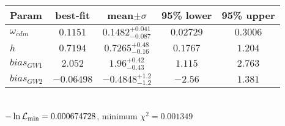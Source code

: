 \begin{tabular}{|l|c|c|c|c|} 
 \hline 
Param & best-fit & mean$\pm\sigma$ & 95\% lower & 95\% upper \\ \hline 
$\omega_{cdm }$ &$0.1151$ & $0.1482_{-0.087}^{+0.041}$ & $0.02729$ & $0.3006$ \\ 
$h$ &$0.7194$ & $0.7265_{-0.16}^{+0.48}$ & $0.1767$ & $1.204$ \\ 
$bias_{GW 1 }$ &$2.052$ & $1.96_{-0.43}^{+0.42}$ & $1.115$ & $2.763$ \\ 
$bias_{GW 2 }$ &$-0.06498$ & $-0.4848_{-1.2}^{+1.2}$ & $-2.56$ & $1.381$ \\ 
\hline 
 \end{tabular} \\ 
$-\ln{\cal L}_\mathrm{min} =0.000674728$, minimum $\chi^2=0.001349$ \\ 
